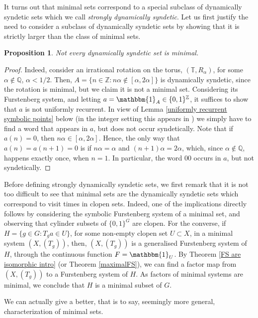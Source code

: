 \documentclass{amsart}
\numberwithin{equation}{section}
\newtheorem{proposition}[lemma]{Proposition}
\theoremstyle{definition}
\theoremstyle{plain}
\newcommand{\Q}{{\mathbb Q}}
\newcommand{\T}{{\mathbb T}}
\newcommand{\Z}{{\mathbb Z}}
\begin{document}
It turns out that minimal sets correspond to a special subclass of dynamically syndetic sets which we call \textit{strongly dynamically syndetic}. Let us first justify the need to consider a subclass of dynamically syndetic sets by showing that it is strictly larger than the class of minimal sets. 

\begin{proposition}
Not every dynamically syndetic set is minimal.    
\end{proposition}

\begin{proof}
Indeed, consider an irrational rotation on 
the torus, $(\T,R_{\alpha})$, for some $\alpha \notin \Q$, $\alpha<1/2$. Then, 
$A=\{n\in \Z: n\alpha \notin [\alpha,2\alpha]\}$ is dynamically syndetic, 
since the rotation is minimal, but we claim it is not a minimal 
set. Considering its Furstenberg system, and letting $a=\mathbbm{1}_A \in \{0,1\}^{\Z}$, it suffices to show that $a$ is not uniformly recurrent. In view of Lemma \ref{uniformly recurrent symbolic points} below (in the integer setting this appears in \cite[Proposition 1.22]{Fur_book}) we simply have to find a word that appears in $a$, but does not occur syndetically. Note that if $a(n)=0$, then $n\alpha \in [\alpha,2\alpha]$. Hence, the only way that $a(n)=a(n+1)=0$ is if $n\alpha=\alpha$ and $(n+1)\alpha=2\alpha$, which, since $\alpha\notin \Q$, happens exactly once, when $n=1$. In particular, the word $00$ occurs in $a$, but not syndetically. 
\end{proof}


Before defining strongly dynamically syndetic sets, we 
first remark that it is not too difficult to see that 
minimal sets are the dynamically syndetic sets which 
correspond to visit times in clopen sets. Indeed, one
of the implications directly follows by considering the 
symbolic Furstenberg system of a minimal set, and 
observing that cylinder subsets of $\{0,1\}^G$ are 
clopen. 
For the converse, if $H=\{g\in G: T_ga\in U\}$, for 
some non-empty clopen set $U\subset X$, in a minimal system $(X,(T_g))$, then, $(X,(T_g))$ is a 
generalised Furstenberg system of $H$, through the continuous 
function $F=\mathbbm{1}_{U}$. By Theorem \ref{FS are isomorphic intro} (or Theorem \ref{maximalFS}), we can find a factor map from $(X,(T_g))$ to a Furstenberg system of $H$. As factors of minimal systems are minimal, we conclude that $H$ is a minimal subset of $G$.

We can actually give a better, that is to say, seemingly 
more general, characterization of minimal sets. 
\end{document}
